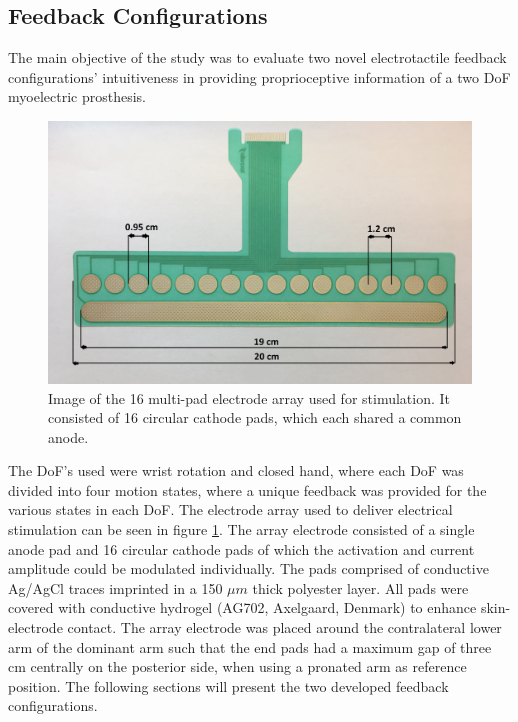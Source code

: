 \subsection{Feedback Configurations}
The main objective of the study was to evaluate two novel electrotactile feedback configurations' intuitiveness in providing proprioceptive information of a two DoF myoelectric prosthesis. 
\begin{figure}[H]                 
	\includegraphics[width=.95\textwidth]{figures/electrode}  
	\caption{Image of the 16 multi-pad electrode array used for stimulation. It consisted of 16 circular cathode pads, which each shared a common anode.}
	\label{fig:pa:electrode} 
\end{figure}
The DoF's used were wrist rotation and closed hand, where each DoF was divided into four motion states, where a unique feedback was provided for the various states in each DoF. The electrode array used to deliver electrical stimulation can be seen in figure \ref{fig:pa:electrode}.
The array electrode consisted of a single anode pad and 16 circular cathode pads of which the activation and current amplitude could be modulated individually. The pads comprised of conductive Ag/AgCl traces imprinted in a 150 $\mu m$ thick polyester layer. All pads were covered with conductive hydrogel (AG702, Axelgaard, Denmark) to enhance skin-electrode contact. The array electrode was placed around the contralateral lower arm of the dominant arm such that the end pads had a maximum gap of three cm centrally on the posterior side, when using a pronated arm as reference position. The following sections will present the two developed feedback configurations. 


